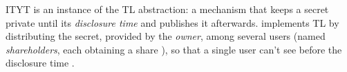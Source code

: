 %
%
%
%


%
%






ITYT is an instance of the TL abstraction: a mechanism that keeps a secret \secret private until its {\em disclosure time} \td and publishes it afterwards.
%
\shortname implements TL by distributing the secret, provided by the {\em owner}, among several users (named {\em shareholders}, each obtaining a share \share), so that a single user can't see  \secret before the disclosure time \td.

